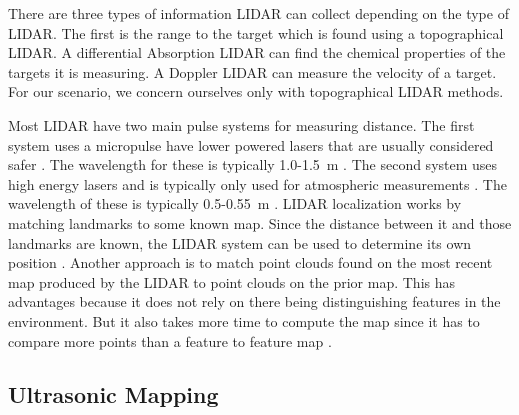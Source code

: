\documentclass{article}
\begin{document}
    There are three types of information LIDAR can collect depending on the type of LIDAR. The first is the range to the target which is found using a topographical LIDAR. A differential Absorption LIDAR can find the chemical properties of the targets it is measuring. A Doppler LIDAR can measure the velocity of a target. For our scenario, we concern ourselves only with topographical LIDAR methods.

    Most LIDAR have two main pulse systems for measuring distance. The first system uses a micropulse have lower powered lasers that are usually considered safer \cite{keith_lidar_2007}. The wavelength for these is typically 1.0-\SI{1.5}{\meter} \cite{lidar_uk_how_2017}. The second system uses high energy lasers and is typically only used for atmospheric measurements \cite{keith_lidar_2007}. The wavelength of these is typically 0.5-\SI{0.55}{\meter} \cite{lidar_uk_how_2017}.
    LIDAR localization works by matching landmarks to some known map. Since the distance between it and those landmarks are known, the LIDAR system can be used to determine its own position \cite{schlichting_vehicle_2016}. Another approach is to match point clouds found on the most recent map produced by the LIDAR to point clouds on the prior map. This has advantages because it does not rely on there being distinguishing features in the environment. But it also takes more time to compute the map since it has to compare more points than a feature to feature map \cite{li_extracting_2010}.


  \subsection{Ultrasonic Mapping}
\end{document}
